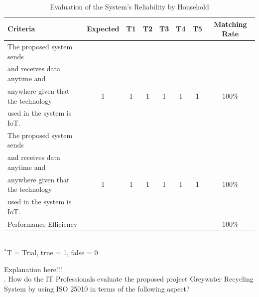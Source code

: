\begin{table}[h!]
\caption{Evaluation of the System’s Reliability by Household}
\vspace{-1em}
\begin{center}
\fontsize{10}{12}\selectfont
\begin{tabular}{|| l c c c c c c c ||} 
 \hline
 Criteria & Expected & T1 & T2 & T3 & T4 & T5 & Matching Rate \\ [0.5ex] 
 \hline\hline
The proposed system sends &  &  &  &  &  &  &  \\
and receives data anytime and &  &  &  &  &  &  &  \\
anywhere given that the technology & 1 & 1 & 1 & 1 & 1 & 1 & 100\% \\
used in the system is IoT. &  &  &  &  &  &  &  \\ 
\hline
The proposed system sends &  &  &  &  &  &  &  \\
and receives data anytime and &  &  &  &  &  &  &  \\
anywhere given that the technology & 1 & 1 & 1 & 1 & 1 & 1 & 100\% \\
used in the system is IoT. &  &  &  &  &  &  &  \\ 
\hline
Performance Efficiency &  &  &  &  &  &  & 100\% \\ 
\hline
\end{tabular} \\
\footnotesize{\hspace{-10cm}$^*$T = Trial, true = 1, false = 0}
\end{center}
\end{table} 

Explanation here!!! \lipsum[1] \\
    
\indent{}. How do the IT Professionals evaluate the proposed project Greywater Recycling System by using ISO 25010 in terms of the following aspect? \\

